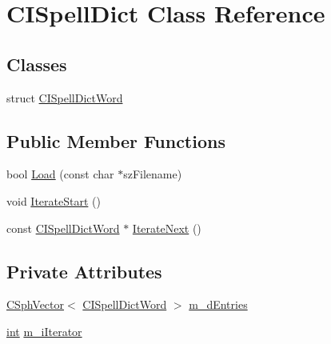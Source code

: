 \hypertarget{classCISpellDict}{\section{C\-I\-Spell\-Dict Class Reference}
\label{classCISpellDict}
}
\subsection*{Classes}
\begin{DoxyCompactItemize}
\item 
struct \hyperlink{structCISpellDict_1_1CISpellDictWord}{C\-I\-Spell\-Dict\-Word}
\end{DoxyCompactItemize}
\subsection*{Public Member Functions}
\begin{DoxyCompactItemize}
\item 
bool \hyperlink{classCISpellDict_ae0d505671dfc08677ad90e4aed81f629}{Load} (const char $\ast$sz\-Filename)
\item 
void \hyperlink{classCISpellDict_ac0c2fb4f684e2bc069cb8b1cf12abe84}{Iterate\-Start} ()
\item 
const \hyperlink{structCISpellDict_1_1CISpellDictWord}{C\-I\-Spell\-Dict\-Word} $\ast$ \hyperlink{classCISpellDict_a300205f58505c91e2e0c215c79cefa82}{Iterate\-Next} ()
\end{DoxyCompactItemize}
\subsection*{Private Attributes}
\begin{DoxyCompactItemize}
\item 
\hyperlink{classCSphVector}{C\-Sph\-Vector}$<$ \hyperlink{structCISpellDict_1_1CISpellDictWord}{C\-I\-Spell\-Dict\-Word} $>$ \hyperlink{classCISpellDict_a6d0bb5cdcaca887ea63ab84d7422f160}{m\-\_\-d\-Entries}
\item 
\hyperlink{sphinxexpr_8cpp_a4a26e8f9cb8b736e0c4cbf4d16de985e}{int} \hyperlink{classCISpellDict_a1156a340a0c04f95c1a62af1998e6d59}{m\-\_\-i\-Iterator}
\end{DoxyCompactItemize}


